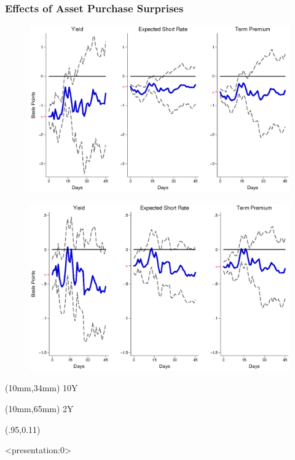 \documentclass[12pt, aspectratio=169, xcolor=dvipsnames]{beamer}  %
\begin{document}
\begin{frame}[label=LSAPUS]
\frametitle{Effects of Asset Purchase Surprises}
\begin{figure}[!htbp]
\begin{center} %
\includegraphics[trim={0cm 0cm 0cm 0cm},clip,height=0.4\textheight,width=0.85\linewidth]{../Figures/LPs/LagDep-FX/LSAP/US/DCMP/LSAPUSDnomyptp120m.eps}
\par\end{center}
\end{figure}
\vspace{-0.5cm}
\begin{figure}[!htbp]
\begin{center} %
\includegraphics[trim={0cm 0cm 0cm 0.76cm},clip,height=0.4\textheight,width=0.85\linewidth]{../Figures/LPs/LagDep-FX/LSAP/US/DCMP/LSAPUSDnomyptp24m.eps}
\par\end{center}
\end{figure}
\begin{textblock*}{8mm}(10mm,34mm)
\small 10Y
\end{textblock*}
\begin{textblock*}{8mm}(10mm,65mm)
\small 2Y
\end{textblock*}
\begin{textblock*}{5cm}(.95\textwidth,0.11\textheight)
	\hyperlink{LSAPEM}{}
\end{textblock*}
\end{frame}


\begin{frame}<presentation:0>
 

\end{frame}
\end{document}
